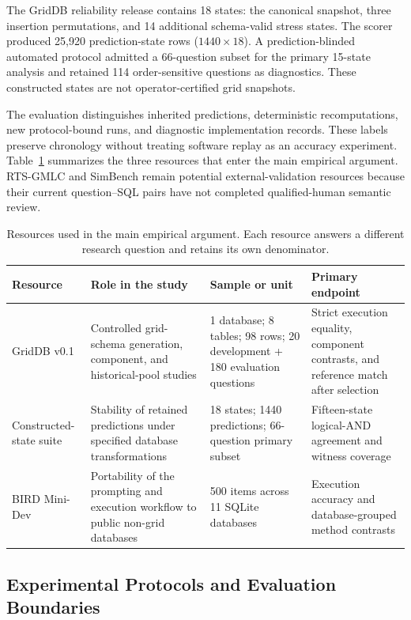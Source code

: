 \documentclass[applsci,article,submit,moreauthors]{Definitions/mdpi}
\begin{document}
The GridDB reliability release contains 18 states: the canonical snapshot, three insertion permutations, and 14 additional schema-valid stress states. The scorer produced 25,920 prediction-state rows ($1440\times18$). A prediction-blinded automated protocol admitted a 66-question subset for the primary 15-state analysis and retained 114 order-sensitive questions as diagnostics. These constructed states are not operator-certified grid snapshots.

The evaluation distinguishes inherited predictions, deterministic recomputations, new protocol-bound runs, and diagnostic implementation records. These labels preserve chronology without treating software replay as an accuracy experiment. Table~\ref{tab:resources} summarizes the three resources that enter the main empirical argument. RTS-GMLC and SimBench remain potential external-validation resources because their current question--SQL pairs have not completed qualified-human semantic review.

\begin{table}[htbp]
\caption{Resources used in the main empirical argument. Each resource answers a different research question and retains its own denominator.}
\label{tab:resources}
\centering
\small
\setlength{\tabcolsep}{2pt}
\begin{tabular}{p{2.6cm}p{4.5cm}p{3.0cm}p{3.0cm}}
\toprule
Resource & Role in the study & Sample or unit & Primary endpoint\\
\midrule
GridDB v0.1 & Controlled grid-schema generation, component, and historical-pool studies & 1 database; 8 tables; 98 rows; 20 development + 180 evaluation questions & Strict execution equality, component contrasts, and reference match after selection\\
Constructed-state suite & Stability of retained predictions under specified database transformations & 18 states; 1440 predictions; 66-question primary subset & Fifteen-state logical-AND agreement and witness coverage\\
BIRD Mini-Dev & Portability of the prompting and execution workflow to public non-grid databases & 500 items across 11 SQLite databases & Execution accuracy and database-grouped method contrasts\\
\bottomrule
\end{tabular}
\end{table}

\subsection{Experimental Protocols and Evaluation Boundaries}
\end{document}
